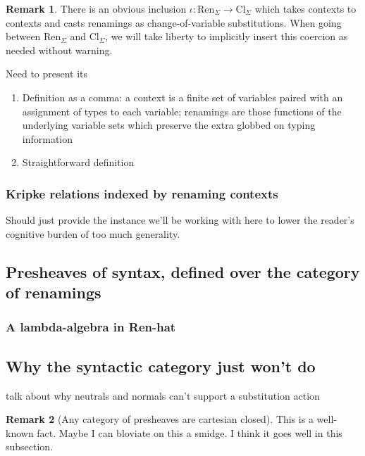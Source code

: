\documentclass[12pt,twoside]{reedthesis}
\theoremstyle{definition}
\newtheorem{remark}{Remark}
\theoremstyle{remark}
\theoremstyle{plain}
\newcommand{\cl}{\text{Cl}_\Sigma}
\newcommand{\ren}{\text{Ren}_\Sigma}
\begin{document}
\begin{remark}
  There is an obvious inclusion \( \iota : \ren \rightarrow \cl \) which takes contexts to
  contexts and casts renamings as change-of-variable substitutions. When going
  between \( \ren \) and \( \cl \), we will take liberty to implicitly insert
  this coercion as needed without warning.
\end{remark}

Need to present its
\begin{enumerate}
  \item Definition as a comma: a context is a finite set of variables paired
        with an assignment of types to each variable; renamings are those
        functions of the underlying variable sets which preserve the extra
        globbed on typing information
  \item Straightforward definition
\end{enumerate}

\subsubsection{Kripke relations indexed by renaming contexts}
Should just provide the instance we'll be working with here to lower the
reader's cognitive burden of too much generality.

\subsection{Presheaves of syntax, defined over the category of renamings}

\subsubsection{A lambda-algebra in Ren-hat}

\subsection{Why the syntactic category just won't do}
talk about why neutrals and normals can't support a substitution action
\begin{remark}[Any category of presheaves are cartesian closed]
  This is a well-known fact. Maybe I can bloviate on this a smidge. I think it goes well in this subsection.
\end{remark}
\end{document}
